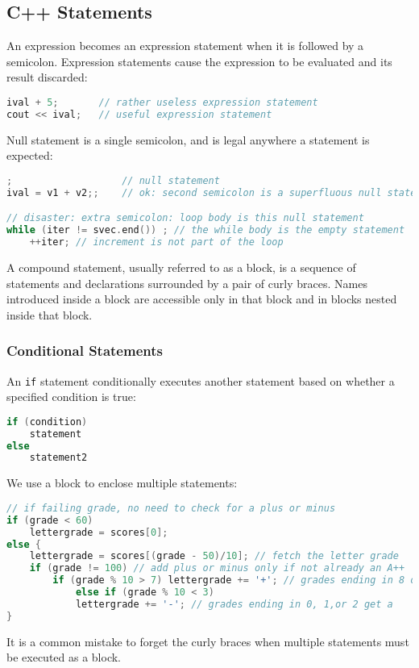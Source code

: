 \subsection{C++ Statements}
\label{task:20231206_cpp}

An expression becomes an expression statement when it is followed by a semicolon. Expression statements cause the expression to be evaluated and its result discarded:
\begin{lstlisting}[language=C++]
ival + 5;       // rather useless expression statement 
cout << ival;   // useful expression statement
\end{lstlisting}

Null statement is a single semicolon, and is legal anywhere a statement is expected:
\begin{lstlisting}[language=C++]
;                   // null statement
ival = v1 + v2;;    // ok: second semicolon is a superfluous null statement

// disaster: extra semicolon: loop body is this null statement 
while (iter != svec.end()) ; // the while body is the empty statement 
    ++iter; // increment is not part of the loop
\end{lstlisting}

A compound statement, usually referred to as a block, is a sequence of statements and declarations surrounded by a pair of curly braces. Names introduced inside a block are accessible only in that block and in blocks nested inside that block.

\subsubsection{Conditional Statements}

An \texttt{if} statement conditionally executes another statement based on whether a specified condition is true:
\begin{lstlisting}[language=C++]
if (condition)
    statement
else
    statement2
\end{lstlisting}

We use a block to enclose multiple statements:
\begin{lstlisting}[language=C++]
// if failing grade, no need to check for a plus or minus 
if (grade < 60) 
    lettergrade = scores[0]; 
else { 
    lettergrade = scores[(grade - 50)/10]; // fetch the letter grade 
    if (grade != 100) // add plus or minus only if not already an A++ 
        if (grade % 10 > 7) lettergrade += '+'; // grades ending in 8 or 9 get a + 
            else if (grade % 10 < 3) 
            lettergrade += '-'; // grades ending in 0, 1,or 2 get a 
}
\end{lstlisting}
It is a common mistake to forget the curly braces when multiple statements must be executed as a block.

